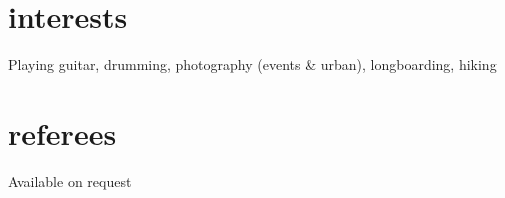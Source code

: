 \documentclass[]{friggeri-cv} %
\begin{document}
\section{interests}

Playing guitar, drumming, photography (events \& urban), longboarding, hiking


\section{referees}

Available on request
\end{document}
